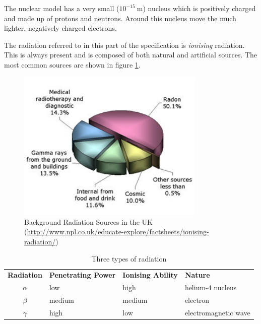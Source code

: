 \documentclass[revision-guide.tex]{subfiles}
\begin{document}

The nuclear model has a very small ($10^{-15}\ \si{\meter}$) nucleus which is positively charged and made up of protons and neutrons. Around this nucleus move the much lighter, negatively charged electrons.


The radiation referred to in this part of the specification is \emph{ionising} radiation. This is always present and is composed of both natural and artificial sources. The most common sources are shown in figure \ref{fig:rad-sources}.

\begin{figure}[h]
  \begin{center}
  \includegraphics[width=0.8\textwidth]{figs/chapt-8/rad-sources.jpg}
\end{center}
  \caption{Background Radiation Sources in the UK (\url{http://www.npl.co.uk/educate-explore/factsheets/ionising-radiation/})}
  \label{fig:rad-sources}
\end{figure}


\begin{table}[h]
\begin{tabular}{clll}
  \textbf{Radiation} & \textbf{Penetrating Power} & \textbf{Ionising Ability} & \textbf{Nature} \\
  $\alpha$ & low & high & helium-4 nucleus \\
  $\beta$ & medium & medium & electron \\
  $\gamma$ & high & low & electromagnetic wave \\
\end{tabular}
\caption{Three types of radiation}
\label{tbl:3-rad}
\end{table}
\end{document}
